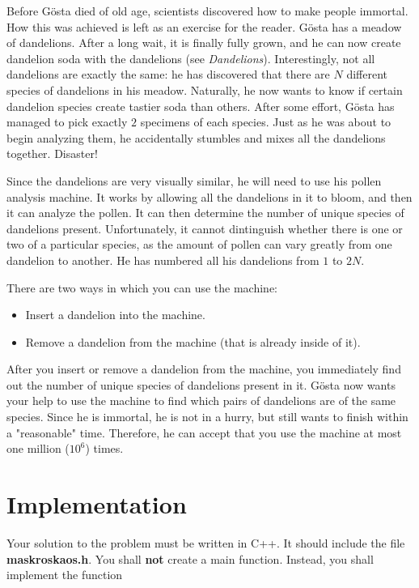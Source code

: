 \noindent

Before Gösta died of old age, scientists discovered how to make people immortal. How this was achieved
is left as an exercise for the reader. Gösta has a meadow of dandelions. After a long wait, it is finally
fully grown, and he can now create dandelion soda with the dandelions (see \textit{Dandelions}). Interestingly,
not all dandelions are exactly the same: he has discovered that there are $N$ different species of dandelions
in his meadow. Naturally, he now wants to know if certain dandelion species create tastier soda than others.
After some effort, Gösta has managed to pick exactly $2$ specimens of each species. Just as he was about to
begin analyzing them, he accidentally stumbles and mixes all the dandelions together. Disaster!

Since the dandelions are very visually similar, he will need to use his pollen analysis machine. It works by
allowing all the dandelions in it to bloom, and then it can analyze the pollen. It can then determine the
number of unique species of dandelions present. Unfortunately, it cannot dintinguish whether there is one or two
of a particular species, as the amount of pollen can vary greatly from one dandelion to another. He has numbered
all his dandelions from $1$ to $2N$.

There are two ways in which you can use the machine:
\begin{itemize}
  \item Insert a dandelion into the machine.
  \item Remove a dandelion from the machine (that is already inside of it).
\end{itemize}

After you insert or remove a dandelion from the machine, you immediately find out the number of unique species
of dandelions present in it. Gösta now wants your help to use the machine to find which pairs of dandelions
are of the same species. Since he is immortal, he is not in a hurry, but still wants to finish within a
"reasonable" time. Therefore, he can accept that you use the machine at most one million ($10^6$) times.


\section*{Implementation}
Your solution to the problem must be written in C++. It should include the file \textbf{maskroskaos.h}. 
You shall \textbf{not} create a main function. Instead, you shall implement the function\\

